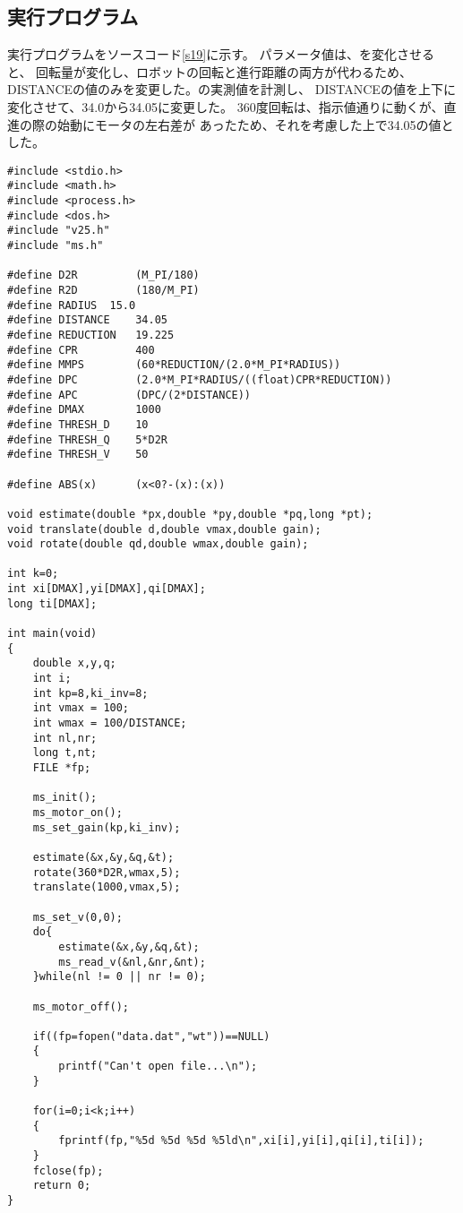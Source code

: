 \subsection{実行プログラム}
実行プログラムをソースコード\ref{s19}に示す。
パラメータ値は、を変化させると、
回転量が変化し、ロボットの回転と進行距離の両方が代わるため、
DISTANCEの値のみを変更した。の実測値を計測し、
DISTANCEの値を上下に変化させて、34.0から34.05に変更した。
360度回転は、指示値通りに動くが、直進の際の始動にモータの左右差が
あったため、それを考慮した上で34.05の値とした。

\begin{lstlisting}[caption=演習19のプログラム,label=s19]
#include <stdio.h>
#include <math.h>
#include <process.h>
#include <dos.h>
#include "v25.h"
#include "ms.h"

#define D2R         (M_PI/180)
#define R2D         (180/M_PI)
#define RADIUS	15.0
#define DISTANCE    34.05
#define REDUCTION   19.225
#define CPR         400
#define MMPS        (60*REDUCTION/(2.0*M_PI*RADIUS))
#define DPC         (2.0*M_PI*RADIUS/((float)CPR*REDUCTION))
#define APC         (DPC/(2*DISTANCE))
#define DMAX        1000
#define THRESH_D    10
#define THRESH_Q    5*D2R
#define THRESH_V    50

#define ABS(x)      (x<0?-(x):(x))

void estimate(double *px,double *py,double *pq,long *pt);
void translate(double d,double vmax,double gain);
void rotate(double qd,double wmax,double gain);

int k=0;
int xi[DMAX],yi[DMAX],qi[DMAX];
long ti[DMAX];

int main(void)
{
    double x,y,q;
    int i;
    int kp=8,ki_inv=8;
    int vmax = 100;
    int wmax = 100/DISTANCE;
    int nl,nr;
    long t,nt;
    FILE *fp;

    ms_init();
    ms_motor_on();
    ms_set_gain(kp,ki_inv);

    estimate(&x,&y,&q,&t);
    rotate(360*D2R,wmax,5);
    translate(1000,vmax,5);

    ms_set_v(0,0);
    do{
        estimate(&x,&y,&q,&t);
        ms_read_v(&nl,&nr,&nt);
    }while(nl != 0 || nr != 0);

    ms_motor_off();

    if((fp=fopen("data.dat","wt"))==NULL)
    {
        printf("Can't open file...\n");
    }

    for(i=0;i<k;i++)
    {
        fprintf(fp,"%5d %5d %5d %5ld\n",xi[i],yi[i],qi[i],ti[i]);
    }
    fclose(fp);
    return 0;
}


\end{lstlisting}
